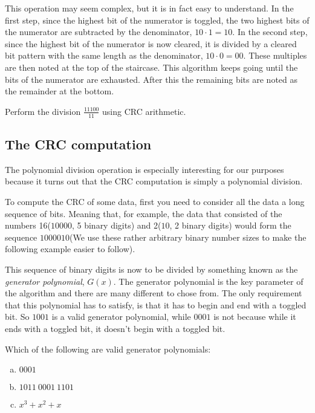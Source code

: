 This operation may seem complex, but it is in fact easy to
understand. In the first step, since the highest bit of the numerator
is toggled, the two highest bits of the numerator are subtracted by
the denominator, $10 \cdot 1 = 10$. In the second step, since the
highest bit of the numerator is now cleared, it is divided by a
cleared bit pattern with the same length as the denominator, $10 \cdot
0 = 00$. These multiples are then noted at the top of the
staircase. This algorithm keeps going until the bits of the numerator
are exhausted. After this the remaining bits are noted as the
remainder at the bottom.

\begin{Exercise}[label={poly-div}]
  Perform the division $\frac{11100}{11}$ using CRC arithmetic.
\end{Exercise}

\subsection{The CRC computation}

The polynomial division operation is especially interesting for our
purposes because it turns out that the CRC computation is simply a
polynomial division.

To compute the CRC of some data, first you need to consider all the
data a long sequence of bits. Meaning that, for example, the data that
consisted of the numbers 16($10000$, 5 binary digits) and 2($10$, 2
binary digits) would form the sequence $1000010$(We use these rather
arbitrary binary number sizes to make the following example easier to
follow).

This sequence of binary digits is now to be divided by something known
as the \textit{generator polynomial}, $G(x)$. The generator polynomial
is the key parameter of the algorithm and there are many different to
chose from. The only requirement that this polynomial has to satisfy,
is that it has to begin and end with a toggled bit. So $1001$ is a valid
generator polynomial, while $0001$ is not because while it ends with a
toggled bit, it doesn't begin with a toggled bit.

\begin{Exercise}[label={valid-gen}]

  Which of the following are valid generator polynomials:

  \begin{enumerate}[(a)]
  \item $0001$
  \item $1011\ 0001\ 1101$
  \item $x^3 + x^2 + x$
  \end{enumerate}

\end{Exercise}

